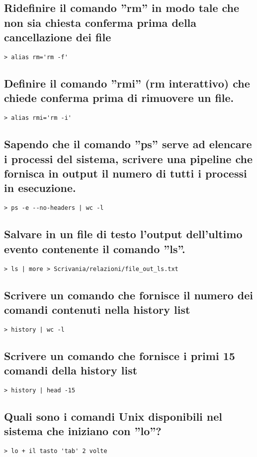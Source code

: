 \subsection{Ridefinire il comando ''rm'' in modo tale che non sia chiesta
conferma prima della cancellazione dei file}
\verb:> alias rm='rm -f': \\


\subsection{Definire il comando ''rmi'' (rm interattivo) che chiede conferma
prima di rimuovere un file.}
\verb:> alias rmi='rm -i': \\


\subsection{Sapendo che il comando ''ps'' serve ad elencare i processi del
sistema, scrivere una pipeline che fornisca in output il numero di tutti i processi in esecuzione.}
\verb:> ps -e --no-headers | wc -l: \\


\subsection{Salvare in un file di testo l’output dell’ultimo evento contenente
il comando ''ls''.}
\verb:> ls | more > Scrivania/relazioni/file_out_ls.txt: \\


\subsection{Scrivere un comando che fornisce il numero dei comandi contenuti nella history list}
\verb:> history | wc -l: \\


\subsection{Scrivere un comando che fornisce i primi 15 comandi della history list}
\verb:> history | head -15: \\


\subsection{Quali sono i comandi Unix disponibili nel sistema che iniziano con
''lo''?}
\verb:> lo + il tasto 'tab' 2 volte: \\


